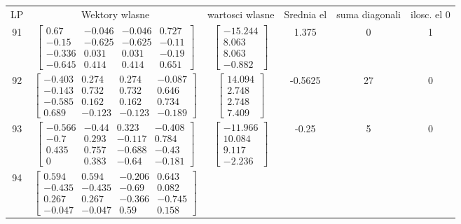 \documentclass[a4paper,12pt]{article}
\begin{document}
\bgroup {} \vspace{0.2in} \begin{tabular}{c c c c c c}
LP &Wektory wlasne & wartosci wlasne & Srednia el & suma diagonali & ilosc. el 0\\
91
&
$\begin{bmatrix} 0.67 & -0.046 & -0.046 & 0.727 \\ -0.15 & -0.625 & -0.625 & -0.11 \\ -0.336 & 0.031 & 0.031 & -0.19 \\ -0.645 & 0.414 & 0.414 & 0.651 \end{bmatrix}$
&
$\begin{bmatrix} -15.244 \\ 8.063 \\ 8.063 \\ -0.882 \end{bmatrix}$
&
1.375
&
0
&
1
\\
92
&
$\begin{bmatrix} -0.403 & 0.274 & 0.274 & -0.087 \\ -0.143 & 0.732 & 0.732 & 0.646 \\ -0.585 & 0.162 & 0.162 & 0.734 \\ 0.689 & -0.123 & -0.123 & -0.189 \end{bmatrix}$
&
$\begin{bmatrix} 14.094 \\ 2.748 \\ 2.748 \\ 7.409 \end{bmatrix}$
&
-0.5625
&
27
&
0
\\
93
&
$\begin{bmatrix} -0.566 & -0.44 & 0.323 & -0.408 \\ -0.7 & 0.293 & -0.117 & 0.784 \\ 0.435 & 0.757 & -0.688 & -0.43 \\ 0 & 0.383 & -0.64 & -0.181 \end{bmatrix}$
&
$\begin{bmatrix} -11.966 \\ 10.084 \\ 9.117 \\ -2.236 \end{bmatrix}$
&
-0.25
&
5
&
0
\\
94
&
$\begin{bmatrix} 0.594 & 0.594 & -0.206 & 0.643 \\ -0.435 & -0.435 & -0.69 & 0.082 \\ 0.267 & 0.267 & -0.366 & -0.745 \\ -0.047 & -0.047 & 0.59 & 0.158 \end{bmatrix}$

\end{tabular}
\end{document}
